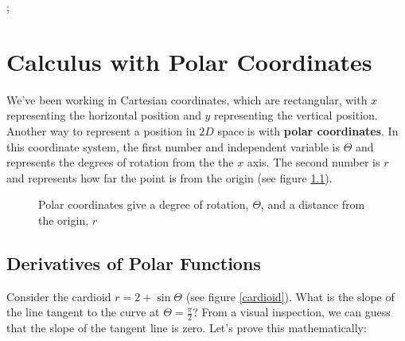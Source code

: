 ;

\chapter{Calculus with Polar Coordinates}

We've been working in Cartesian coordinates, which are rectangular, with $x$ representing the horizontal position and $y$ representing the vertical position. Another way to represent a position in $2D$ space is with \textbf{polar coordinates}. In this coordinate system, the first number and independent variable is $\Theta$ and represents the degrees of rotation from the the $x$ axis. The second number is $r$ and represents how far the point is from the origin (see figure \ref{polarex}). 

\begin{figure}[htbp]
\centering
    \label{polarex}
    \caption{Polar coordinates give a degree of rotation, $\Theta$, and a distance from the origin, $r$}
    \end{figure}

\section{Derivatives of Polar Functions}
Consider the cardioid $r = 2 + \sin{\Theta}$ (see figure \ref{cardioid}). What is the slope of the line tangent to the curve at $\Theta = \frac{\pi}{2}$? From a visual inspection, we can guess that the slope of the tangent line is zero. Let's prove this mathematically:

